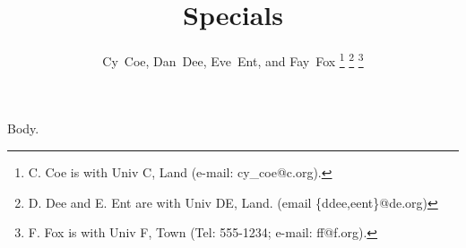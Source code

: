 \documentclass[journal]{IEEEtran}
\begin{document}
\title{Specials}
\author{Cy~Coe, Dan~Dee, Eve~Ent, and Fay~Fox%
\thanks{C. Coe is with Univ C, Land (e-mail: cy\_coe@c.org).}
\thanks{D. Dee and E. Ent are with Univ DE, Land. (email \{ddee,eent\}@de.org)}
\thanks{F. Fox is with Univ F, Town (Tel: 555-1234; e-mail: ff@f.org).}}
\maketitle
Body.
\end{document}
